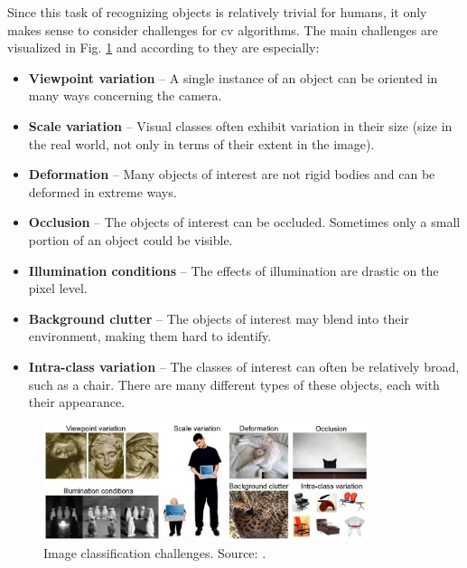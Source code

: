         Since this task of recognizing objects is relatively trivial for humans, it only makes sense to consider challenges for \gls{cv} algorithms. The main challenges are visualized in Fig. \ref{fig:image_classification_challenges} and according to \cite{cs231n} they are especially:
    
        \begin{itemize}
            \item \textbf{Viewpoint variation} -- A single instance of an object can be oriented in many ways concerning the camera.
            \item \textbf{Scale variation} -- Visual classes often exhibit variation in their size (size in the real world, not only in terms of their extent in the image).
            \item \textbf{Deformation} -- Many objects of interest are not rigid bodies and can be deformed in extreme ways.
            \item \textbf{Occlusion} -- The objects of interest can be occluded. Sometimes only a small portion of an object could be visible.
            \item \textbf{Illumination conditions} -- The effects of illumination are drastic on the pixel level.
            \item \textbf{Background clutter} -- The objects of interest may blend into their environment, making them hard to identify.
            \item \textbf{Intra-class variation} -- The classes of interest can often be relatively broad, such as a chair. There are many different types of these objects, each with their appearance.
        \end{itemize}
        
        \begin{figure}[ht]
            \centering
            \includegraphics[width=0.85\textwidth]{resources/image_classification_challenges.png}
            \caption{Image classification challenges. Source: \cite{cs231n}.}
            \label{fig:image_classification_challenges}
        \end{figure}
        
